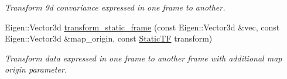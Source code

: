 \begin{DoxyCompactItemize}
\begin{DoxyCompactList}\small\item\em Transform 9d convariance expressed in one frame to another. \end{DoxyCompactList}\item 
Eigen\+::\+Vector3d \mbox{\hyperlink{group__nodelib_ga3907cb8493e1b0c7ae33dbc1e8185a88}{transform\+\_\+static\+\_\+frame}} (const Eigen\+::\+Vector3d \&vec, const Eigen\+::\+Vector3d \&map\+\_\+origin, const \mbox{\hyperlink{group__nodelib_gacff0983128574bbbe115917b13e57a63}{Static\+TF}} transform)
\begin{DoxyCompactList}\small\item\em Transform data expressed in one frame to another frame with additional map origin parameter. \end{DoxyCompactList}\end{DoxyCompactItemize}
